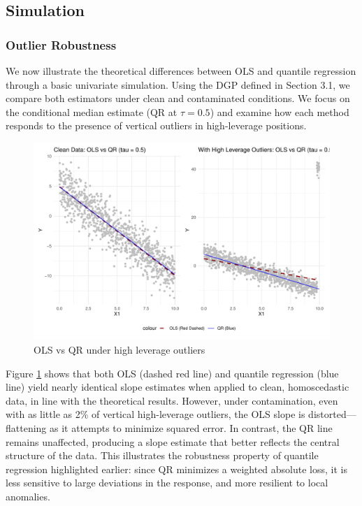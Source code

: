 \documentclass[fleqn,10pt]{latex/stylish_article} %
\begin{document}
\subsection{Simulation}\label{simulation}

\subsubsection{Outlier Robustness}\label{outlier-robustness}

We now illustrate the theoretical differences between OLS and quantile regression through a basic univariate simulation. Using the DGP defined in Section 3.1, we compare both estimators under clean and contaminated conditions. We focus on the conditional median estimate (QR at \(\tau = 0.5\)) and examine how each method responds to the presence of vertical outliers in high-leverage positions.

\begin{figure}[h]

{\centering \includegraphics[width=0.8\linewidth]{ADR_project_draft_files/figure-latex/fig1-1} 

}

\caption{OLS vs QR under high leverage outliers}\label{fig:fig1}
\end{figure}

Figure \ref{fig:fig1} shows that both OLS (dashed red line) and quantile regression (blue line) yield nearly identical slope estimates when applied to clean, homoscedastic data, in line with the theoretical results. However, under contamination, even with as little as 2\% of vertical high-leverage outliers, the OLS slope is distorted---flattening as it attempts to minimize squared error. In contrast, the QR line remains unaffected, producing a slope estimate that better reflects the central structure of the data. This illustrates the robustness property of quantile regression highlighted earlier: since QR minimizes a weighted absolute loss, it is less sensitive to large deviations in the response, and more resilient to local anomalies.
\end{document}
